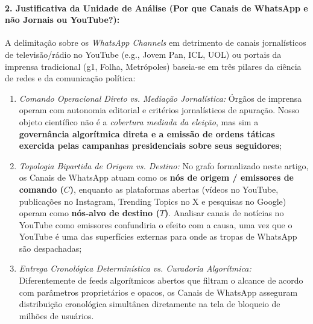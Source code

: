 \documentclass[12pt]{article}
\begin{document}
\paragraph{2. Justificativa da Unidade de Análise (Por que Canais de WhatsApp e não Jornais ou YouTube?):}
A delimitação sobre os \textit{WhatsApp Channels} em detrimento de canais jornalísticos de televisão/rádio no YouTube (e.g., Jovem Pan, ICL, UOL) ou portais da imprensa tradicional (g1, Folha, Metrópoles) baseia-se em três pilares da ciência de redes e da comunicação política:
\begin{enumerate}
    \item \textit{Comando Operacional Direto vs. Mediação Jornalística:} Órgãos de imprensa operam com autonomia editorial e critérios jornalísticos de apuração. Nosso objeto científico não é a \textit{cobertura mediada da eleição}, mas sim a \textbf{governância algorítmica direta e a emissão de ordens táticas exercida pelas campanhas presidenciais sobre seus seguidores};
    \item \textit{Topologia Bipartida de Origem vs. Destino:} No grafo formalizado neste artigo, os Canais de WhatsApp atuam como os \textbf{nós de origem / emissores de comando ($C$)}, enquanto as plataformas abertas (vídeos no YouTube, publicações no Instagram, Trending Topics no X e pesquisas no Google) operam como \textbf{nós-alvo de destino ($T$)}. Analisar canais de notícias no YouTube como emissores confundiria o efeito com a causa, uma vez que o YouTube é uma das superfícies externas para onde as tropas de WhatsApp são despachadas;
    \item \textit{Entrega Cronológica Determinística vs. Curadoria Algorítmica:} Diferentemente de feeds algorítmicos abertos que filtram o alcance de acordo com parâmetros proprietários e opacos, os Canais de WhatsApp asseguram distribuição cronológica simultânea diretamente na tela de bloqueio de milhões de usuários.
\end{enumerate}
\end{document}
